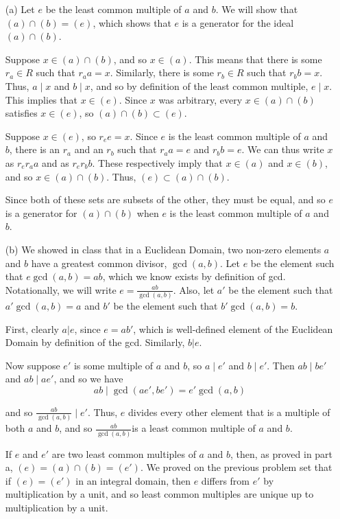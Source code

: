 \documentclass{hmwk}
\begin{document}
\begin{solution}
\begin{itemize}
    \item[(a)] 
    \pre Let $e$ be the least common multiple of $a$ and $b$. We will show that $(a) \cap (b) = (e)$, which shows that $e$ is a generator for the ideal $(a) \cap (b)$.

    \pre Suppose $x \in (a) \cap (b)$, and so $x \in (a)$. This means that there is some $r_a \in R$ such that $r_aa = x$. Similarly, there is some $r_b \in R$ such that $r_bb = x$. Thus, $a \mid x$ and $b \mid x$, and so by definition of the least common multiple, $e \mid x$. This implies that $x \in (e)$. Since $x$ was arbitrary, every $x \in (a) \cap (b)$ satisfies $x \in (e)$, so $(a) \cap (b) \subset (e)$.
    
    \pre Suppose $x \in (e)$, so $r_ee = x$. Since $e$ is the least common multiple of $a$ and $b$, there is an $r_a$ and an $r_b$ such that $r_aa = e$ and $r_bb = e$. We can thus write $x$ as $r_er_aa$ and as $r_er_bb$. These respectively imply that $x \in (a)$ and $x \in (b)$, and so $x \in (a) \cap (b)$. Thus, $(e) \subset (a) \cap (b)$.
    
    \pre Since both of these sets are subsets of the other, they must be equal, and so $e$ is a generator for $(a) \cap (b)$ when $e$ is the least common multiple of $a$ and $b$.

    \item[(b)] We showed in class that in a Euclidean Domain, two non-zero elements $a$ and $b$ have a greatest common divisor, $\gcd(a, b)$. Let $e$ be the element such that $e\gcd(a, b) = ab$, which we know exists by definition of gcd. Notationally, we will write $e = \frac{ab}{\gcd(a, b)}$. Also, let $a'$ be the element such that $a'\gcd(a, b) = a$ and $b'$ be the element such that $b'\gcd(a, b) = b$.

    \pre First, clearly $a | e$, since $e = ab'$, which is well-defined element of the Euclidean Domain by definition of the gcd. Similarly, $b | e$. 

    \pre Now suppose $e'$ is some multiple of $a$ and $b$, so $a \mid e'$ and $b \mid e'$. Then $ab \mid be'$ and $ab \mid ae'$, and so we have 
    $$ab \mid \gcd(ae', be') = e'\gcd(a, b)$$

    \pre and so $\frac{ab}{\gcd(a, b)} \mid e'$. Thus, $e$ divides every other element that is a multiple of both $a$ and $b$, and so $\frac{ab}{\gcd(a, b)}$is a least common multiple of $a$ and $b$.

    \pre If $e$ and $e'$ are two least common multiples of $a$ and $b$, then, as proved in part a, $(e) = (a) \cap (b) = (e')$. We proved on the previous problem set that if $(e) = (e')$ in an integral domain, then $e$ differs from $e'$ by multiplication by a unit, and so least common multiples are unique up to multiplication by a unit.
\end{itemize}


\end{solution}
\end{document}

